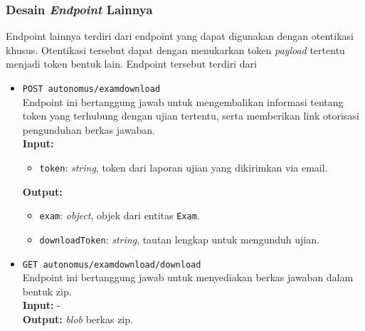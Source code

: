 \subsubsection{Desain \textit{Endpoint} Lainnya} Endpoint lainnya terdiri dari
    endpoint yang dapat digunakan dengan otentikasi khusus. Otentikasi tersebut
    dapat dengan menukarkan token \textit{payload} tertentu menjadi token bentuk
    lain. Endpoint tersebut terdiri dari
    \begin{itemize}
        \item \texttt{POST autonomus/examdownload} \\
            Endpoint ini bertanggung jawab untuk mengembalikan informasi tentang
            token yang terhubung dengan ujian tertentu, serta memberikan link
            otorisasi pengunduhan berkas jawaban.\\
            \textbf{Input:} \begin{itemize}
                \item \texttt{token}: \textit{string}, token dari laporan ujian
                    yang dikirimkan via email.
            \end{itemize}
            \textbf{Output:} \begin{itemize}
                \item \texttt{exam}: \textit{object}, objek dari entitas \texttt{Exam}.
                \item \texttt{downloadToken}: \textit{string}, tautan lengkap untuk
                    mengunduh ujian.
            \end{itemize}
            
        \item \texttt{GET autonomus/examdownload/download} \\
            Endpoint ini bertanggung jawab untuk menyediakan berkas jawaban
            dalam bentuk zip.\\
            \textbf{Input:} -\\
            \textbf{Output:} \textit{blob} berkas zip.
    \end{itemize}
    
